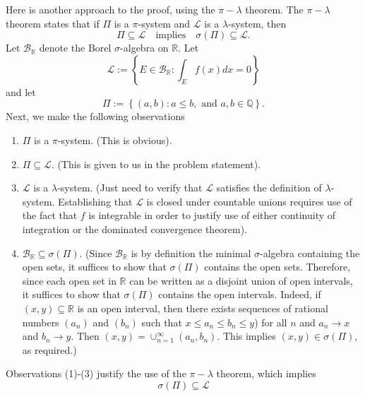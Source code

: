 \documentclass[answers]{exam}
\theoremstyle{problemstyle}
\newcommand{\1}[1]{\textbf{1}_{\left[#1\right]}} %
\begin{document}
\begin{questions}
\begin{solution}
Here is another approach to the proof, using the $\pi-\lambda$ theorem. The
$\pi-\lambda$ theorem states that if $\Pi$ is a $\pi$-system and $\mathcal{L}$
is a $\lambda$-system, then
\begin{equation*}
  \Pi\subseteq \mathcal{L}
  \quad \text{implies} \quad
  \sigma(\Pi) \subseteq \mathcal{L}.
\end{equation*}
Let $\mathcal{B}_{\mathbb{R}}$ denote the Borel $\sigma$-algebra on
$\mathbb{R}$. Let
\begin{equation*}
  \mathcal{L} 
  := \left\{ E \in  \mathcal{B}_{\mathbb{R}} :  \int_{E}f(x)dx  = 0 \right\}
\end{equation*}
and let 
\begin{equation*}
  \Pi := \left\{(a,b):a \leq b, \text{ and } a,b\in \mathbb{Q}\right\}.
\end{equation*}
Next, we make the following observations
\begin{enumerate}
  \item $\Pi$ is a $\pi$-system. (This is obvious).
  \item $\Pi\subseteq \mathcal{L}$. (This is given to us in the problem
  statement).
  \item $\mathcal{L}$ is a $\lambda$-system. (Just need to verify that
  $\mathcal{L}$ satisfies the definition of $\lambda$-system. Establishing that
  $\mathcal{L}$ is closed under countable unions requires use of the fact that
  $f$ is integrable in order to justify use of either continuity of integration
  or the dominated convergence theorem).
  \item $  \mathcal{B}_{\mathbb{R}}\subseteq \sigma(\Pi)$. (Since
  $\mathcal{B}_{\mathbb{R}}$ is by definition the minimal $\sigma$-algebra
  containing the open sets, it suffices to show that $\sigma(\Pi)$ contains the
  open sets. Therefore, since each open set in $\mathbb{R}$ can be written as a
  disjoint union of open intervals, it suffices to show that $\sigma(\Pi)$
  contains the open intervals. Indeed, if $(x,y)\subseteq \mathbb{R}$ is an open
  interval, then there exists sequences of rational numbers $(a_{n})$ and
  $(b_{n})$ such that $x\leq a_{n}\leq b_{n}\leq y$) for all $n$ and
  $a_{n}\to x$ and $b_{n}\to y$. Then $(x,y)= \cup_{n=1}^{\infty}(a_{n},b_{n})$.
  This implies $(x,y)\in \sigma(\Pi)$, as required.)
\end{enumerate}
Observations (1)-(3) justify the use of the $\pi-\lambda$ theorem, which implies
\begin{equation*}
  \sigma(\Pi)\subseteq \mathcal{L}
\end{equation*}

\end{solution}
\end{questions}
\end{document}
